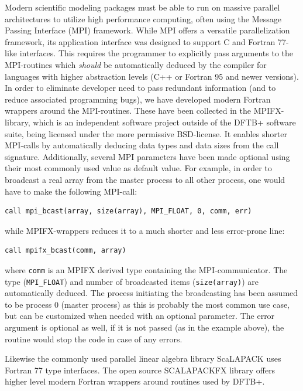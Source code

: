 \documentclass{revtex4-1}
\newcommand{\dftbp}{DFTB+}
\begin{document}
Modern scientific modeling packages must be able to run on massive parallel
architectures to utilize high performance computing, often using the Message
Passing Interface (MPI) framework. While MPI offers a versatile parallelization
framework, its application interface was designed to support C and Fortran
77-like interfaces. This requires the programmer to explicitly pass arguments to the
MPI-routines which {\em should} be automatically deduced by the compiler for
languages with higher abstraction levels (C++ or Fortran 95 and newer versions).
In order to eliminate developer need to pass redundant information (and to
reduce associated programming bugs), we have developed modern Fortran wrappers
around the MPI-routines. These have been collected in the
MPIFX-library,\cite{mpifx} which is an independent software project outside of the
\dftbp{} software suite, being licensed under the more permissive
BSD-license. It enables shorter MPI-calls by automatically deducing data types
and data sizes from the call signature. Additionally, several MPI parameters
have been made optional using their most commonly used value as default
value. For example, in order to broadcast a real array from the master process
to all other process, one would have to make the following MPI-call:
\begin{verbatim}
call mpi_bcast(array, size(array), MPI_FLOAT, 0, comm, err)
\end{verbatim}
while MPIFX-wrappers reduces it to a much shorter and less error-prone line:
\begin{verbatim}
call mpifx_bcast(comm, array)
\end{verbatim}
where \verb|comm| is an MPIFX derived type containing the MPI-communicator. The
type (\verb|MPI_FLOAT|) and number of broadcasted items (\verb|size(array)|) are
automatically deduced. The process initiating the broadcasting has been assumed
to be process 0 (master process) as this is probably the most common use case,
but can be customized when needed with an optional parameter. The error
argument is optional as well, if it is not passed (as in the example above),
the routine would stop the code in case of any errors.

Likewise the commonly used parallel linear algebra library ScaLAPACK uses
Fortran 77 type interfaces. The open source SCALAPACKFX
library\cite{scalapackfx} offers higher level modern Fortran wrappers around
routines used by \dftbp{}.
\end{document}
